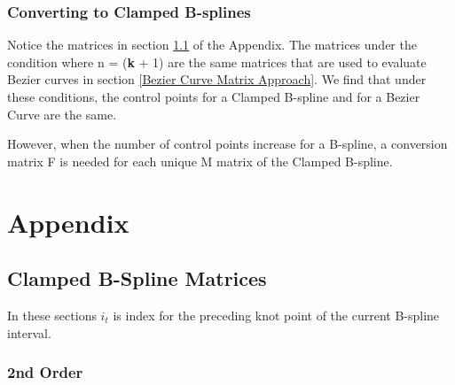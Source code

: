 \documentclass{article}
\begin{document}
\subsubsection{Converting to Clamped B-splines}

Notice the matrices in section \ref{sec:Clamped B-Spline Matrices} of the Appendix. The matrices under the condition where n = (\textbf{k} + 1) are the same matrices that are used to evaluate Bezier curves in section \ref{Bezier Curve Matrix Approach}. We find that under these conditions, the control points for a Clamped B-spline and for a Bezier Curve are the same.

However, when the number of control points increase for a B-spline, a conversion matrix F is needed for each unique M matrix of the Clamped B-spline. 

\section{Appendix}

    \subsection{Clamped B-Spline Matrices} \label{sec:Clamped B-Spline Matrices}
    
    In these sections \(i_t\) is index for the preceding knot point of the current B-spline interval.
    
    \subsubsection{2nd Order} \label{sec: Clamped 2nd order matrices}
    
\end{document}
